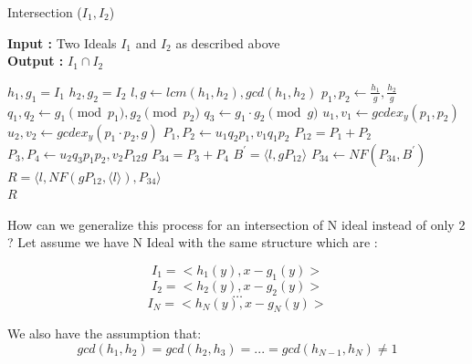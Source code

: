 \documentclass{article}
\begin{document}
\newpage
\begin{algorithm}
    \caption{Intersection ($I_{1}, I_{2}$)} \label{alg:intersect-2-ideals}
    \textbf{Input : }Two Ideals $I_{1}$ and $I_{2}$ as described above \\
    \textbf{Output : }$I_{1} \cap I_{2}$
\begin{algorithmic}
    \State $h_{1}, g_{1} = I_{1}$ 
    \State $h_{2}, g_{2} = I_{2}$ 
    \State $l, g \gets lcm(h_{1}, h_{2}), gcd(h_{1}, h_{2})$
    \State $p_{1}, p_{2} \gets \frac{h_{1}}{g}, \frac{h_{2}}{g}$
    \State $q_{1}, q_{2} \gets g_{1} \pmod {p_{1}}, g_{2} \pmod {p_{2}}$
    \State $q_{3} \gets g_{1} \cdot g_{2} \pmod {g}$ 
    \State $u_{1}, v_{1} \gets gcdex_{y} (p_{1}, p_{2})$ 
    \State $u_{2}, v_{2} \gets gcdex_{y} (p_{1} \cdot p_{2}, g)$ 
    \State $P_{1}, P_{2} \gets u_{1}q_{2}p_{1}, v_{1}q_{1}p_{2}$ 
    \State $P_{12} = P_{1} + P_{2}$
    \State $P_{3}, P_{4} \gets u_{2}q_{3}p_{1}p_{2}, v_{2}P_{12}g$
    \State $P_{34} = P_{3} + P_{4}$
    \State $B^{\prime} = \langle l, gP_{12} \rangle$
    \State $P_{34} \gets NF(P_{34}, B^{\prime})$
    \State $R = \langle l, NF(gP_{12}, \langle l \rangle), P_{34} \rangle$ \\
    \Return $R$
\end{algorithmic}
\end{algorithm}

How can we generalize this process for an intersection of N ideal instead of only 2 ?
Let assume we have N Ideal with the same structure which are : 

\[I_{1} = <h_{1}(y),x-g_{1}(y)>\]
\[I_{2} = <h_{2}(y),x-g_{2}(y)>\]
\[\dots\]
\[I_{N} = <h_{N}(y),x-g_{N}(y)>\]

We also have the assumption that: \[gcd(h_{1},h_{2})=gcd(h_{2},h_{3})=...=gcd(h_{N-1},h_{N})\neq1\]
\end{document}
